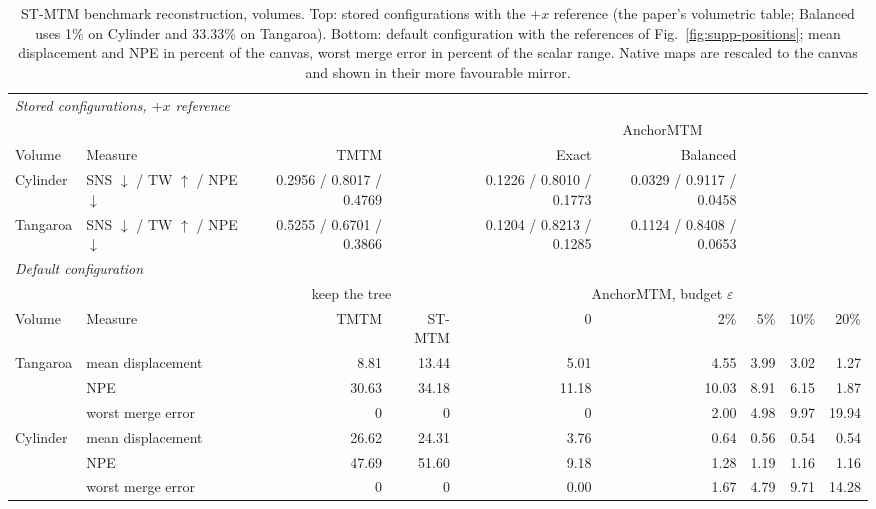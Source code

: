 \documentclass[preprint]{vgtc}   %
\begin{document}
\begin{table}[t]
\centering\small
\caption{ST-MTM benchmark reconstruction, volumes. Top: stored configurations with the $+x$ reference (the paper's volumetric table; Balanced uses 1\% on Cylinder and 33.33\% on Tangaroa). Bottom: default configuration with the references of Fig.~\ref{fig:supp-positions}; mean displacement and NPE in percent of the canvas, worst merge error in percent of the scalar range. Native maps are rescaled to the canvas and shown in their more favourable mirror.}\label{tab:full-volume}
\setlength{\tabcolsep}{4.2pt}
\begin{tabular}{ll|rr|rrrrr}\toprule
\multicolumn{9}{l}{\emph{Stored configurations, $+x$ reference}}\\
 & & \multicolumn{2}{c|}{} & \multicolumn{5}{c}{AnchorMTM}\\
Volume & Measure & TMTM & & Exact & Balanced & & & \\\midrule
Cylinder & SNS $\downarrow$ / TW $\uparrow$ / NPE $\downarrow$ & 0.2956 / 0.8017 / 0.4769 & & 0.1226 / 0.8010 / 0.1773 & 0.0329 / 0.9117 / 0.0458 & & & \\
Tangaroa & SNS $\downarrow$ / TW $\uparrow$ / NPE $\downarrow$ & 0.5255 / 0.6701 / 0.3866 & & 0.1204 / 0.8213 / 0.1285 & 0.1124 / 0.8408 / 0.0653 & & & \\\midrule
\multicolumn{9}{l}{\emph{Default configuration}}\\
 & & \multicolumn{2}{c|}{keep the tree} & \multicolumn{5}{c}{AnchorMTM, budget $\varepsilon$}\\
Volume & Measure & TMTM & ST-MTM & 0 & 2\% & 5\% & 10\% & 20\%\\\midrule
Tangaroa & mean displacement & 8.81 & 13.44 & 5.01 & 4.55 & 3.99 & 3.02 & 1.27\\
 & NPE & 30.63 & 34.18 & 11.18 & 10.03 & 8.91 & 6.15 & 1.87\\
 & worst merge error & 0 & 0 & 0 & 2.00 & 4.98 & 9.97 & 19.94\\
Cylinder & mean displacement & 26.62 & 24.31 & 3.76 & 0.64 & 0.56 & 0.54 & 0.54\\
 & NPE & 47.69 & 51.60 & 9.18 & 1.28 & 1.19 & 1.16 & 1.16\\
 & worst merge error & 0 & 0 & 0.00 & 1.67 & 4.79 & 9.71 & 14.28\\\bottomrule
\end{tabular}
\end{table}


\FloatBarrier


\end{document}
